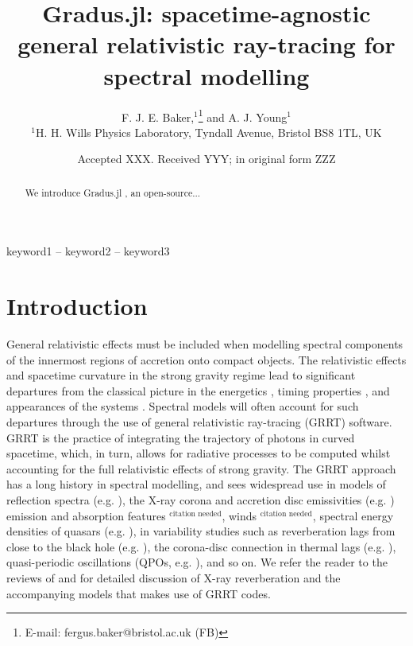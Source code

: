 \documentclass[fleqn,usenatbib]{mnras}
\title[Gradus.jl]{Gradus.jl: spacetime-agnostic general relativistic ray-tracing
for spectral modelling}
\author[F. J. E. Baker et al.]{
F. J. E. Baker,$^{1}$\thanks{E-mail: fergus.baker@bristol.ac.uk (FB)}
and A. J. Young$^{1}$
\\
$^{1}$H. H. Wills Physics Laboratory, Tyndall Avenue, Bristol BS8 1TL, UK
}
\date{Accepted XXX. Received YYY; in original form ZZZ}
\newcommand{\citneeded}{{\bf \color{red} $^{\text{citation needed}}$}}
\newcommand{\Gradus}{Gradus.jl }
\begin{document}
\label{firstpage}
\pagerange{\pageref{firstpage}--\pageref{lastpage}}
\maketitle
\begin{abstract}
	We introduce \Gradus, an open-source...
\end{abstract}

\begin{keywords}
keyword1 -- keyword2 -- keyword3
\end{keywords}



\section{Introduction}

General relativistic effects must be included when modelling spectral components
of the innermost regions of accretion onto compact objects. The relativistic
effects and spacetime curvature in the strong gravity regime lead to significant
departures from the classical picture in the energetics
\citep{cunningham_optical_1973, fabian_long_2002}, timing properties
\citep{stella_measuring_1990, reynolds_x-ray_1999}, and appearances of the
systems \citep{luminet_image_1979}. Spectral models will often account for such
departures
through the use of general relativistic ray-tracing (GRRT) software. GRRT is the
practice of integrating the trajectory of photons in curved spacetime, which, in
turn, allows for radiative processes to be computed whilst accounting for the
full relativistic effects of strong gravity. The GRRT approach has a long
history in spectral modelling, and sees widespread use in models of reflection
spectra (e.g. \citealt{fabian_x-ray_1989}), the
X-ray corona and accretion disc emissivities (e.g.  \citealt{wilkins_understanding_2012, wilkins_towards_2016})
emission and absorption features\citneeded, winds\citneeded, spectral energy densities of
quasars (e.g.  \citealt{hagen_estimating_2023}), in variability studies such as
reverberation lags from close to the black hole (e.g.
\citealt{ingram_public_2019}), the corona-disc connection in thermal
lags (e.g. \citealt{kammoun_hard_2019}), quasi-periodic oscillations (QPOs, e.g.
\citealt{tsang_iron_2013}), and so on.  We refer the reader to the reviews of
\citet{uttley_x-ray_2014} and \citet{cackett_reverberation_2021} for detailed
discussion of X-ray reverberation and the accompanying models that makes use of GRRT codes.
\end{document}

